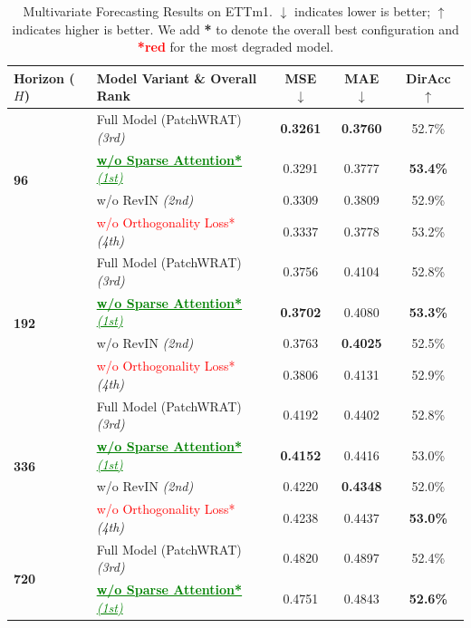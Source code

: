 \documentclass[11pt, letterpaper]{article}
\begin{document}
\begin{table}[H]
\centering
\caption{Multivariate Forecasting Results on ETTm1. $\downarrow$ indicates lower is better; $\uparrow$ indicates higher is better. We add \textbf{*} to denote the overall best configuration and \textcolor{red}{\textbf{*red}} for the most degraded model.}
\label{tab:ablation-results}
\renewcommand{\arraystretch}{1.3}
\sffamily
\begin{tabular}{@{}llccc@{}}
\toprule
\textbf{Horizon ($H$)} & \textbf{Model Variant \& Overall Rank} & \textbf{MSE} $\downarrow$ & \textbf{MAE} $\downarrow$ & \textbf{DirAcc} $\uparrow$ \\
\midrule
\multirow{4}{*}{\textbf{96}} 
 & Full Model (PatchWRAT) \textit{(3rd)} & \textbf{0.3261} & \textbf{0.3760} & 52.7\% \\
 & \textcolor{green}{\underline{\textbf{w/o Sparse Attention*} \textit{(1st)}}} & 0.3291 & 0.3777 & \textbf{53.4\%} \\
 & w/o RevIN \textit{(2nd)} & 0.3309 & 0.3809 & 52.9\% \\
 & \textcolor{red}{w/o Orthogonality Loss*} \textit{(4th)} & 0.3337 & 0.3778 & 53.2\% \\
\midrule
\multirow{4}{*}{\textbf{192}} 
 & Full Model (PatchWRAT) \textit{(3rd)} & 0.3756 & 0.4104 & 52.8\% \\
 & \textcolor{green}{\underline{\textbf{w/o Sparse Attention*} \textit{(1st)}}} & \textbf{0.3702} & 0.4080 & \textbf{53.3\%} \\
 & w/o RevIN \textit{(2nd)} & 0.3763 & \textbf{0.4025} & 52.5\% \\
 & \textcolor{red}{w/o Orthogonality Loss*} \textit{(4th)} & 0.3806 & 0.4131 & 52.9\% \\
\midrule
\multirow{4}{*}{\textbf{336}} 
 & Full Model (PatchWRAT) \textit{(3rd)} & 0.4192 & 0.4402 & 52.8\% \\
 & \textcolor{green}{\underline{\textbf{w/o Sparse Attention*} \textit{(1st)}}} & \textbf{0.4152} & 0.4416 & 53.0\% \\
 & w/o RevIN \textit{(2nd)} & 0.4220 & \textbf{0.4348} & 52.0\% \\
 & \textcolor{red}{w/o Orthogonality Loss*} \textit{(4th)} & 0.4238 & 0.4437 & \textbf{53.0\%} \\
\midrule
\multirow{4}{*}{\textbf{720}} 
 & Full Model (PatchWRAT) \textit{(3rd)} & 0.4820 & 0.4897 & 52.4\% \\
 & \textcolor{green}{\underline{\textbf{w/o Sparse Attention*} \textit{(1st)}}} & 0.4751 & 0.4843 & \textbf{52.6\%} \\

\end{tabular}
\end{table}
\end{document}
